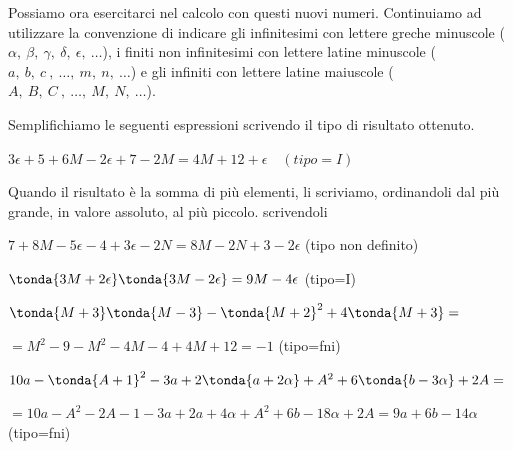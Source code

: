 Possiamo ora esercitarci nel calcolo con questi nuovi numeri. 
Continuiamo ad utilizzare la convenzione di indicare gli 
infinitesimi con lettere greche minuscole
($\alpha,~\beta,~\gamma,~\delta,~\epsilon,~\dots$), 
i finiti non infinitesimi con lettere latine minuscole 
($a,~b,~c~,~\dots,~m,~n,~\dots$) 
e gli infiniti con lettere latine maiuscole 
($A,~B,~C~,~\dots,~M,~N,~\dots$).

\begin{exrig}
Semplifichiamo le seguenti espressioni scrivendo il tipo di risultato 
ottenuto.

 \begin{esempio}
  $3\epsilon +5 +6M -2\epsilon +7 -2M = 4M +12 +\epsilon \quad (tipo=I)$
 \end{esempio}

\begin{osservazione}
Quando il risultato è la somma di più elementi, li scriviamo, ordinandoli 
dal 
più grande, in valore assoluto, al più piccolo.
scrivendoli 
\end{osservazione}

 \begin{esempio}
\(7 +8M -5\epsilon  -4 +3\epsilon-2N = 8M -2N +3 -2\epsilon\)
\quad (tipo non definito)
 \end{esempio}
 
 \begin{esempio}
\(\tonda{3M +2\epsilon} \tonda{3M -2\epsilon} = 9M -4\epsilon\)
\quad (tipo=I)
 \end{esempio}
 
 \begin{esempio}
\(\tonda{M +3} \tonda{M -3} - \tonda{M+2}^2 +4\tonda{M +3}=\)

\(=M^2 -9 -M^2 -4M -4 +4M +12 = -1\)
\quad (tipo=fni)
 \end{esempio}
 
 \begin{esempio}
\(10a -\tonda{A +1}^2 -3a +2\tonda{a+2\alpha} +A^2 +6\tonda{b -3\alpha} 
+2A= 
\)

\(=10a -A^2 -2A -1 -3a +2a+4\alpha +A^2 +6b -18\alpha +2A = 9a +6b 
-14\alpha\) 
\quad (tipo=fni)
 \end{esempio}
\end{exrig}



